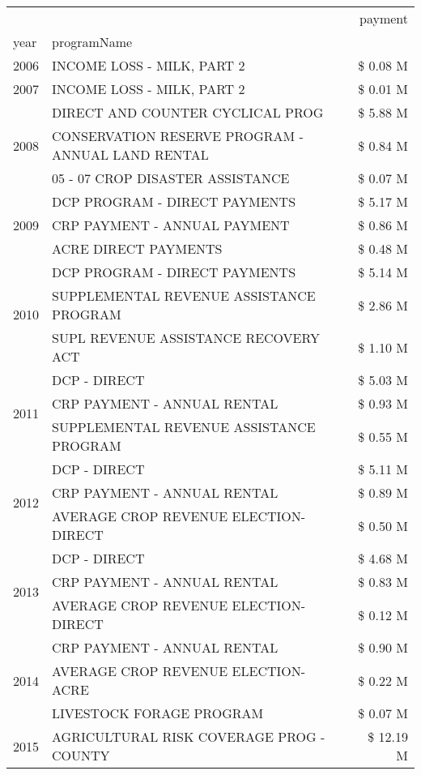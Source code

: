 \begin{tabular}{llr}
\toprule
 &  & payment \\
year & programName &  \\
\midrule
2006 & INCOME LOSS - MILK, PART 2 & \$ 0.08 M \\
\cline{1-3}
2007 & INCOME LOSS - MILK, PART 2 & \$ 0.01 M \\
\cline{1-3}
\multirow[t]{3}{*}{2008} & DIRECT AND COUNTER CYCLICAL PROG & \$ 5.88 M \\
 & CONSERVATION RESERVE PROGRAM - ANNUAL LAND RENTAL & \$ 0.84 M \\
 & 05 - 07 CROP DISASTER ASSISTANCE & \$ 0.07 M \\
\cline{1-3}
\multirow[t]{3}{*}{2009} & DCP PROGRAM - DIRECT PAYMENTS & \$ 5.17 M \\
 & CRP PAYMENT - ANNUAL PAYMENT & \$ 0.86 M \\
 & ACRE DIRECT PAYMENTS & \$ 0.48 M \\
\cline{1-3}
\multirow[t]{3}{*}{2010} & DCP PROGRAM - DIRECT PAYMENTS & \$ 5.14 M \\
 & SUPPLEMENTAL REVENUE ASSISTANCE PROGRAM & \$ 2.86 M \\
 & SUPL REVENUE ASSISTANCE RECOVERY ACT & \$ 1.10 M \\
\cline{1-3}
\multirow[t]{3}{*}{2011} & DCP - DIRECT & \$ 5.03 M \\
 & CRP PAYMENT - ANNUAL RENTAL & \$ 0.93 M \\
 & SUPPLEMENTAL REVENUE ASSISTANCE PROGRAM & \$ 0.55 M \\
\cline{1-3}
\multirow[t]{3}{*}{2012} & DCP - DIRECT & \$ 5.11 M \\
 & CRP PAYMENT - ANNUAL RENTAL & \$ 0.89 M \\
 & AVERAGE CROP REVENUE ELECTION-DIRECT & \$ 0.50 M \\
\cline{1-3}
\multirow[t]{3}{*}{2013} & DCP - DIRECT & \$ 4.68 M \\
 & CRP PAYMENT - ANNUAL RENTAL & \$ 0.83 M \\
 & AVERAGE CROP REVENUE ELECTION-DIRECT & \$ 0.12 M \\
\cline{1-3}
\multirow[t]{3}{*}{2014} & CRP PAYMENT - ANNUAL RENTAL & \$ 0.90 M \\
 & AVERAGE CROP REVENUE ELECTION-ACRE & \$ 0.22 M \\
 & LIVESTOCK FORAGE PROGRAM & \$ 0.07 M \\
\cline{1-3}
\multirow[t]{3}{*}{2015} & AGRICULTURAL RISK COVERAGE PROG - COUNTY & \$ 12.19 M \\

\end{tabular}
